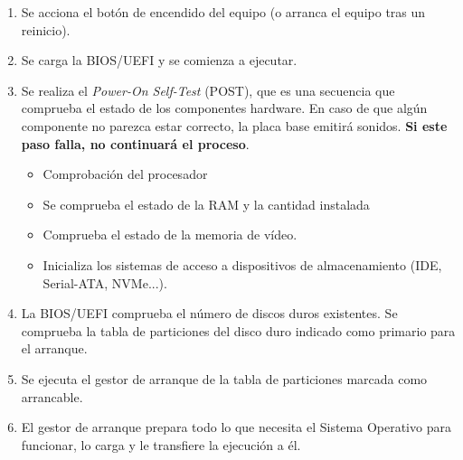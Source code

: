 \begin{enumerate}
    \item Se acciona el botón de encendido del equipo (o arranca el equipo tras un reinicio).
    \item Se carga la BIOS/UEFI y se comienza a ejecutar.
    \item Se realiza el \textit{Power-On Self-Test} (POST), que es una secuencia que comprueba el estado de los componentes hardware. En caso de que algún componente no parezca estar correcto, la placa base emitirá sonidos. \textbf{Si este paso falla, no continuará el proceso}.


    \begin{itemize}
        \item Comprobación del procesador
        \item Se comprueba el estado de la RAM y la cantidad instalada
        \item Comprueba el estado de la memoria de vídeo.
        \item Inicializa los sistemas de acceso a dispositivos de almacenamiento (IDE, Serial-ATA, NVMe...).
    \end{itemize}

    \item La BIOS/UEFI comprueba el número de discos duros existentes. Se comprueba la tabla de particiones del disco duro indicado como primario para el arranque.
    \item Se ejecuta el gestor de arranque de la tabla de particiones marcada como arrancable.
    \item El gestor de arranque prepara todo lo que necesita el Sistema Operativo para funcionar, lo carga y le transfiere la ejecución a él.
\end{enumerate}
